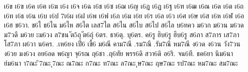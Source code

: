 {%
เ6ข
เ6ฃ
เ6ค
เ6ฅ
เ6ฆ
เ6ง
เ6จ
เ6ฉ
เ6ช
เ6ซ
เ6ฌ
เ6ญ
เ6ฎ
เ6ฏ
เ6ฐ
เ6ฑ
เ6ฒ
เ6ณ
เ6ด
เ6ต
เ6ถ
เ6ท
เ6ธ
เ6น
เ6บ
เ6ป
7เ6ผ
เ6ฝ
เ6พ
เ6ฟ
เ6ภ
เ6ม
เ6ย
เ6ร
เ6ล
เ6ว
เ6ศ
เ6ษ
เ6ส
เ6ห
เ6ฬ
เ6อ
เ6ฮ
ช6วา.
ช6ไ
ธ6ไน
ม6ไห
ส6ไต
เลส7ไต
ส6ไน
ส6ไบ
ส6ไป
ส6ไล
บ6ทคว
ม6วก
ม6วน
ม6วด
ม7วดี
ม6วย
ะม6วง
ล7ชน
ัต5ถุ
ัต6ถุ์
6ตร.
ธา6ตุ.
บุ6ตร.
ค6รู
ฮิบ6รู
ฮีบ6รู
ส6ภา
ส7ภาร
เส7ภา
โส7ภา
ผ6วา
น6คร.
.เห6ยง
เปี่6
เขี้6
ม6ณี
คาม7ณี
.รม7ณี
.รัม7ณี
หม7ณี
ง6วด
ง6วน
วัง7วน
ง6วย
มง6วง
อย6อด
พ6ญา
จุ6รณ
ฤ6ชา
.ฤ6ทัย
พรร6ดิ
สวา6ดิ
อ6ริ.
จน6ที.
ธค6ยา
นิม6นา
ย์ม6นา
า7ณะ
ิ7ณะ
ุ7ณะ
ณ7ณะ
ก7ณะ
ท7ณะ
ล7ณะ
ุษ7ณะ
ฤษ7ณะ
รป7ณะ
หม7ณะ
สม7ณะ
}
